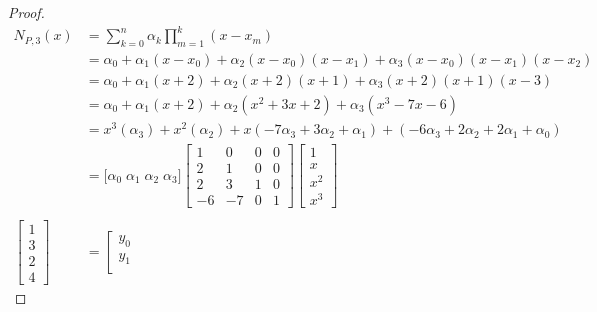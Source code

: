\begin{example}
\end{example}
\begin{proof}
\begin{align*}
  N_{P,3}(x)
    &= \sum_{k=0}^n \alpha_k \prod_{m=1}^k (x-x_m)
  \\&= \alpha_0 + \alpha_1(x-x_0) + \alpha_2(x-x_0)(x-x_1) + \alpha_3(x-x_0)(x-x_1)(x-x_2) 
  \\&= \alpha_0 + \alpha_1(x+2) + \alpha_2(x+2)(x+1) + \alpha_3(x+2)(x+1)(x-3) 
  \\&= \alpha_0 + \alpha_1(x+2) + \alpha_2(x^2+3x+2) + \alpha_3(x^3-7x-6)
  \\&= x^3(\alpha_3) + x^2(\alpha_2) + x(-7\alpha_3+3\alpha_2+\alpha_1)
      +(-6\alpha_3 + 2\alpha_2 + 2\alpha_1 + \alpha_0)
  \\&= \Big[ \alpha_0 \; \alpha_1 \; \alpha_2 \; \alpha_3 \Big] 
       \left[\begin{array}{rrrr}
          1  &   0  & 0  & 0  \\
          2  &   1  & 0  & 0  \\
          2  &   3  & 1  & 0  \\
         -6  &  -7  & 0  & 1
       \end{array}\right]
       \left[\begin{array}{l}
         1   \\
         x   \\
         x^2 \\
         x^3
       \end{array}\right]
  \\
  \\
  \left[\begin{array}{l}
     1  \\
     3  \\
     2  \\
     4  
  \end{array}\right]
    &= \left[\begin{array}{l}
         y_0 \\
         y_1 \\

\end{array}
\end{align*}
\end{proof}
